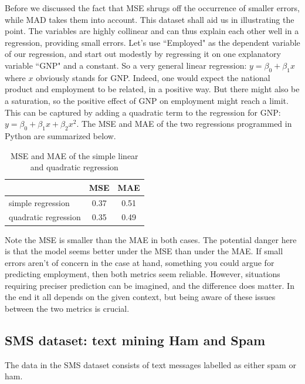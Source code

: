 \documentclass[english, a4paper]{article}
\begin{document}
Before we discussed the fact that MSE shrugs off the occurrence of smaller errors, while MAD takes them into account. This dataset shall aid us in illustrating the point. The variables are highly collinear and can thus explain each other well in a regression, providing small errors. Let's use ``Employed" as the dependent variable of our regression, and start out modestly by regressing it on one explanatory variable ``GNP" and a constant. So a very general linear regression: $\displaystyle y = \beta_{0} + \beta_{1}x$ where $x$ obviously stands for GNP. Indeed, one would expect the national product and employment to be related, in a positive way. But there might also be a saturation, so the positive effect of GNP on employment might reach a limit. This can be captured by adding a quadratic term to the regression for GNP: $\displaystyle y = \beta_{0} + \beta_{1}x +\beta_{2}x^{2}$. The MSE and MAE of the two regressions programmed in Python are summarized below.

\begin{table}[H]
    \centering
    \begin{tabular}{l | c | c}
        & MSE & MAE\\ \hline
        simple regression & 0.37& 0.51 \\
        quadratic regression & 0.35 & 0.49
    \end{tabular}
    \caption{MSE and MAE of the simple linear and quadratic regression}
    \label{table:MSE_vs_MAE}
\end{table}
\noindent Note the MSE is smaller than the MAE in both cases. The potential danger here is that the model seems better under the MSE than under the MAE. If small errors aren't of concern in the case at hand, something you could argue for predicting employment, then both metrics seem reliable. However, situations requiring preciser prediction can be imagined, and the difference does matter. In the end it all depends on the given context, but being aware of these issues between the two metrics is crucial.

\subsection{SMS dataset: text mining Ham and Spam}
The data in the SMS dataset consists of text messages labelled as either spam or ham.             


\end{document}
